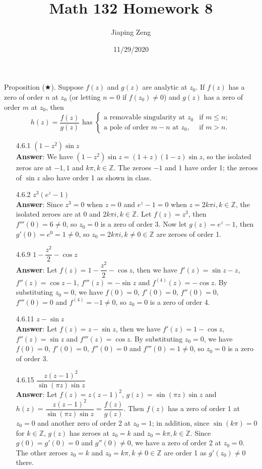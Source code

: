 \documentclass{article}
\title{Math 132 Homework 8}
\date{11/29/2020}
\author{Jiaping Zeng}
\begin{document}
\maketitle


\noindent Proposition ($\bigstar$). Suppose $f(z)$ and $g(z)$ are analytic at $z_0$. If $f(z)$ has a zero of order $n$ at $z_0$ (or letting $n=0$ if $f(z_0)\neq 0$) and $g(z)$ has a zero of order $m$ at $z_0$, then \[h(z)=\dfrac{f(z)}{g(z)}\text{ has }\begin{cases}
            \text{a removable singularity at }z_0     & \text{if }m\leq n; \\
            \text{a pole of order }m-n\text{ at }z_0, & \text{if }m>n.
      \end{cases}\]
\begin{itemize}
      \item [4.6.1] $(1-z^2)\sin z$\\
            \textbf{Answer}: We have $(1-z^2)\sin z=(1+z)(1-z)\sin z$, so the isolated zeros are at $-1,1$ and $k\pi,k\in\mathbb{Z}$. The zeroes $-1$ and $1$ have order 1; the zeroes of $\sin z$ also have order 1 as shown in class.
      \item [4.6.2] $z^3(e^z-1)$\\
            \textbf{Answer}: Since $z^3=0$ when $z=0$ and $e^z-1=0$ when $z=2k\pi i,k\in\mathbb{Z}$, the isolated zeroes are at $0$ and $2k\pi i,k\in\mathbb{Z}$. Let $f(z)=z^3$, then $f'''(0)=6\neq 0$, so $z_0=0$ is a zero of order 3. Now let $g(z)=e^z-1$, then $g'(0)=e^0=1\neq 0$, so $z_0=2k\pi i,k\neq 0\in\mathbb{Z}$ are zeroes of order 1.
      \item [4.6.9] $1-\dfrac{z^2}{2}-\cos z$\\
            \textbf{Answer}: Let $f(z)=1-\dfrac{z^2}{2}-\cos z$, then we have $f'(z)=\sin z-z$, $f''(z)=\cos z-1$, $f'''(z)=-\sin z$ and $f^{(4)}(z)=-\cos z$. By substituting $z_0=0$, we have $f(0)=0$, $f'(0)=0$, $f''(0)=0$, $f'''(0)=0$ and $f^{(4)}=-1\neq 0$, so $z_0=0$ is a zero of order 4.
      \item [4.6.11] $z-\sin z$\\
            \textbf{Answer}: Let $f(z)=z-\sin z$, then we have $f'(z)=1-\cos z$, $f''(z)=\sin z$ and $f'''(z)=\cos z$. By substituting $z_0=0$, we have $f(0)=0$, $f'(0)=0$, $f''(0)=0$ and $f'''(0)=1\neq 0$, so $z_0=0$ is a zero of order 3.
      \item [4.6.15] $\dfrac{z(z-1)^2}{\sin(\pi z)\sin z}$\\
            \textbf{Answer}: Let $f(z)=z(z-1)^2$, $g(z)=\sin(\pi z)\sin z$ and $h(z)=\dfrac{z(z-1)^2}{\sin(\pi z)\sin z}=\dfrac{f(z)}{g(z)}$. Then $f(z)$ has a zero of order 1 at $z_0=0$ and another zero of order 2 at $z_0=1$; in addition, since $\sin(k\pi)=0$ for $k\in\mathbb{Z}$, $g(z)$ has zeroes at $z_0=k$ and $z_0=k\pi,k\in\mathbb{Z}$. Since $g(0)=g'(0)=0$ and $g''(0)\neq 0$, we have a zero of order 2 at $z_0=0$. The other zeroes $z_0=k$ and $z_0=k\pi,k\neq 0\in\mathbb{Z}$ are order 1 as $g'(z_0)\neq 0$ there.\\

\end{itemize}
\end{document}

